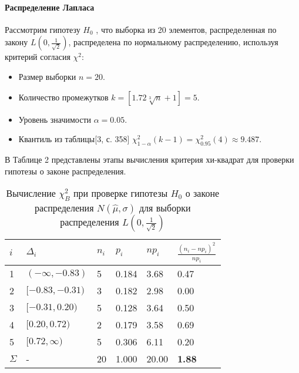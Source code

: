\documentclass[12pt]{article}
\begin{document}
\paragraph{Распределение Лапласа}
Рассмотрим гипотезу $H_0$ , что выборка из 20 элементов, распределенная по закону  $L(0,\frac{1}{\sqrt{2}})$, распределена по нормальному распределению, используя критерий согласия $\chi^2$:
\begin{itemize}
	\item Размер выборки $n=20$.
	\item Количество промежутков $k = [1.72\sqrt[3]{n}+1] = 5$.
	\item Уровень значимости $\alpha = 0.05$.
	\item Квантиль из таблицы[3, с. 358] $\chi^2_{1-\alpha}(k-1) = \chi^2_{0.95}(4) \approx 9.487$.
\end{itemize}

В Таблице 2 представлены этапы вычисления критерия хи-квадрат для проверки гипотезы о законе распределения.
	
		\begin{table}[H]
			\begin{center}
			\label{Lap}
		\begin{tabular}{|l|l|l|l|l|l|}
			\hline
			$i$      & $\Delta_i$             & $n_i$ & $p_i$ & $n p_i$ & $\frac{(n_i - np_i)^2}{np_i}$ \\ \hline
			1        & $(-\infty, -0.83)$ & 5  & 0.184 & 3.68 & 0.47                         \\ \hline
			2        & $[-0.83, -0.31)$   & 3  & 0.182 & 2.98 & 0.00                       \\ \hline
			3       & $[-0.31, 0.20)$    & 5  & 0.128 & 3.64 & 0.50                       \\ \hline
			4       & $[0.20, 0.72)$     & 2  & 0.179 & 3.58 & 0.69                         \\ \hline
			5       & $[0.72, \infty)$   & 5  & 0.306 & 6.11 & 0.20                         \\ \hline
			$\Sigma$ & -                      & 20    & 1.000  & 20.00    & {\bf1.88}                  \\ \hline
		\end{tabular}
	\end{center}
	
	\caption{Вычисление $\chi_{B}^2$ при проверке гипотезы $H_0$ о законе распределения $N(\hat{\mu}, \hat{\sigma})$ для выборки распределения $L(0,\frac{1}{\sqrt{2}})$}
	\end{table}
	
\end{document}
